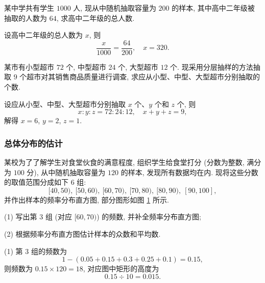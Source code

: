 \lianxi
\begin{exercise}
    某中学共有学生 $1000$ 人, 现从中随机抽取容量为 $200$ 的样本, 其中高中二年级被抽取的人数为 $64$, 求高中二年级的总人数.
\end{exercise}
\beginsolution
    设高中二年级的总人数为 $x$, 则
    \[\frac{x}{1000}= \frac{64}{200},\quad x=320.\]
\endsolution

\begin{exercise}
    某市有小型超市 $72$ 个, 中型超市 $24$ 个, 大型超市 $12$ 个. 现采用分层抽样的方法抽取 $9$ 个超市对其销售商品质量进行调查, 求应从小型、中型、大型超市分别抽取的个数. 
\end{exercise}
\beginsolution
    设应从小型、中型、大型超市分别抽取 $x$ 个、$y$ 个和 $z$ 个, 则
    \[x:y:z= 72:24:12,\quad x+y+z= 9,\]
    解得 $x=6$, $y=2$, $z=1$.
\endsolution

\subsubsection{总体分布的估计}
\begin{example}
    某校为了了解学生对食堂伙食的满意程度, 组织学生给食堂打分 (分数为整数, 满分为 $100$ 分), 从中随机抽取容量为 $120$ 的样本, 发现所有数据均在内. 现将这些分数的取值范围分成如下 $6$ 组:
    \[[40, 50),\ [50, 60),\ [60, 70),\ 
    [70, 80),\ [80, 90),\  [90, 100],\]
    并作出样本的频率分布直方图, 部分图形如图 \ref{fig-190629-1650} 所示.
    \begin{figure}[htb]
        \small
        \centering
       \caption{}\label{fig-190629-1650}
    \end{figure}
    
    (1) 写出第 $3$ 组 (对应 $[60, 70)$) 的频数, 并补全频率分布直方图;
    
    (2) 根据频率分布直方图估计样本的众数和平均数. 
\end{example}
\beginsolution
    (1) 第 $3$ 组的频数为
    \[1-(0.05+0.15+0.3+0.25+0.1)= 0.15,\]
    则频数为 $0.15\times 120= 18$, 对应图中矩形的高度为
    \[0.15\div 10= 0.015.\]

